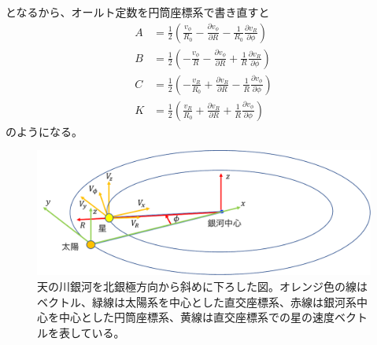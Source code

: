 となるから、オールト定数を円筒座標系で書き直すと
\begin{subequations}
\begin{align}
	A &=\frac{1}{2}\left( \frac{v_{\phi}}{R_0} - \frac{\partial v_{\phi}}{\partial R} - \frac{1}{R_0}\frac{\partial v_{R}}{\partial \phi} \right) \label{eq2.5a}\\
	B &=\frac{1}{2}\left( -\frac{v_{\phi}}{R} - \frac{\partial v_{\phi}}{\partial R} + \frac{1}{R}\frac{\partial v_{R}}{\partial \phi} \right) \label{eq2.5b}\\
	C &=\frac{1}{2}\left( -\frac{v_{R}}{R_0} + \frac{\partial v_R}{\partial R} - \frac{1}{R}\frac{\partial v_{\phi}}{\partial \phi} \right) \label{eq2.5c}\\
	K &=\frac{1}{2}\left( \frac{v_{R}}{R_0} + \frac{\partial v_R}{\partial R} + \frac{1}{R}\frac{\partial v_{\phi}}{\partial \phi} \right) \label{eq2.5d}
\end{align} \label{eq2.5}
\end{subequations}
のようになる。


\begin{figure}[htbp]
	\centering
	\includegraphics[width=13cm]{fig/Coordinates.pdf}
	\caption{天の川銀河を北銀極方向から斜めに下ろした図。オレンジ色の線はベクトル、緑線は太陽系を中心とした直交座標系、赤線は銀河系中心を中心とした円筒座標系、黄線は直交座標系での星の速度ベクトルを表している。}
	\label{fig:coordinates}
\end{figure}

